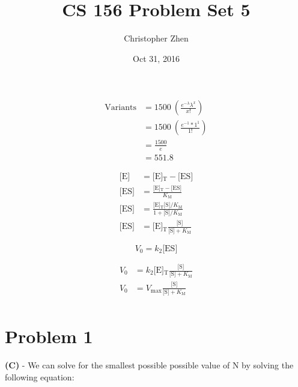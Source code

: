 \documentclass[10pt,letter]{article}
\begin{document}


\title{CS 156 Problem Set 5}

\author{Christopher Zhen}

\date{Oct 31, 2016}
 
\maketitle 
	
\begin{align}
\textrm{Variants} & = 1500 \ (\frac{e^{-\lambda}\lambda ^x}{x!}) \\
& = 1500 \ (\frac{e^{-1} * 1 ^1}{1!}) \\
& = \frac{1500}{e} \\
& = 551.8
\end{align}

\begin{align}
\textrm{[E]} & = \textrm{[E]$_\textrm{T}$} - \textrm{[ES]} \\
\textrm{[ES]} & = \frac{\textrm{[E]$_\textrm{T}$}-\textrm{[ES]}}{K_\textrm{M}} \\
\textrm{[ES]} & = \frac{\textrm{[E]$_\textrm{T}$[S]}/K_\textrm{M}}{1+\textrm{[S]}/K_\textrm{M}} \\
\textrm{[ES]} & = \textrm{[E]$_\textrm{T}$} \frac{\textrm{[S]}}{\textrm{[S]}+K_\textrm{M}}
\end{align}

\begin{equation}
V_0 = k_2\textrm{[ES]}
\end{equation}

\begin{align}
V_0 & = k_2 \textrm{[E]$_\textrm{T}$} \frac{\textrm{[S]}}{\textrm{[S]}+K_\textrm{M}} \\
V_0 & = V_\textrm{max} \frac{\textrm{[S]}}{\textrm{[S]}+K_\textrm{M}} \\
\end{align}

\section*{Problem 1}

\textbf{(C)} - We can solve for the smallest possible possible value of N by solving the following equation:
\end{document}
